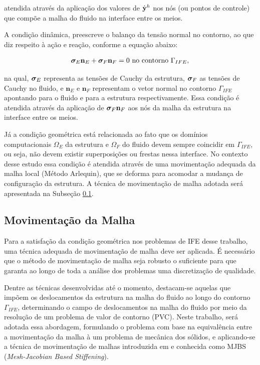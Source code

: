 \documentclass[tese_patricia]{subfiles}
\begin{document}
\noindent atendida através da aplicação dos valores de $\dot{\mathbf{y}}^h$ nos nós (ou pontos de controle) que compõe a malha do fluido na interface entre os meios.

A condição dinâmica, preescreve o balanço da tensão normal no contorno, ao que diz respeito à ação e reação, conforme a equação abaixo:

\begin{align}
	\bm{\sigma}_{E}\mathbf{n}_{E} + \bm{\sigma}_{F}\mathbf{n}_{F} = 0 \ \textrm{no contorno} \ \Gamma_{IFE},
\end{align}

\noindent na qual, $\bm{\sigma}_{E}$ representa as tensões de Cauchy da estrutura, $\bm{\sigma}_{F}$ as tensões de Cauchy no fluido, e $\mathbf{n}_E$ e $\mathbf{n}_F$ representam o vetor normal no contorno $\Gamma_{IFE}$ apontando para o fluido e para a estrutura respectivamente. Essa condição é atendida através da aplicação de $\bm{\sigma}_{F}\mathbf{n}_{F}$ aos nós da malha da estrutura na interface entre os meios.

Já a condição geométrica está relacionada ao fato que os domínios computacionais $\Omega_E$ da estrutura e $\Omega_F$ do fluido devem sempre coincidir em $\Gamma_{IFE}$, ou seja, não devem existir superposições ou frestas nessa interface. No contexto desse estudo essa condição é atendida através de uma movimentação adequada da malha local (Método Arlequin), que se deforma para acomodar a mudança de configuração da estrutura. A técnica de movimentação de malha adotada será apresentada na Subseção \ref{capitulo:Cap7:CondAcop:MovMalha}.

\subsection{Movimentação da Malha} \label{capitulo:Cap7:CondAcop:MovMalha}

Para a satisfação da condição geométrica nos problemas de IFE desse trabalho, uma técnica adequada de movimentação de malha deve ser aplicada. É necessário que o método de movimentação de malha seja robusto o suficiente para que garanta ao longo de toda a análise dos problemas uma discretização de qualidade.

Dentre as técnicas desenvolvidas até o momento, destacam-se aquelas que impõem os deslocamentos da estrutura na malha do fluido ao longo do contorno $\Gamma_{IFE}$, determinando o campo de deslocamentos na malha do fluido por meio da resolução de um problema de valor de contorno (PVC). Neste trabalho, será adotada essa abordagem, formulando o problema com base na equivalência entre a movimentação da malha à um problema de mecânica dos sólidos, e aplicando-se a técnica de movimentação de malhas introduzida em  e  conhecida como MJBS (\textit{Mesh-Jacobian Based Stiffening}).
\end{document}
